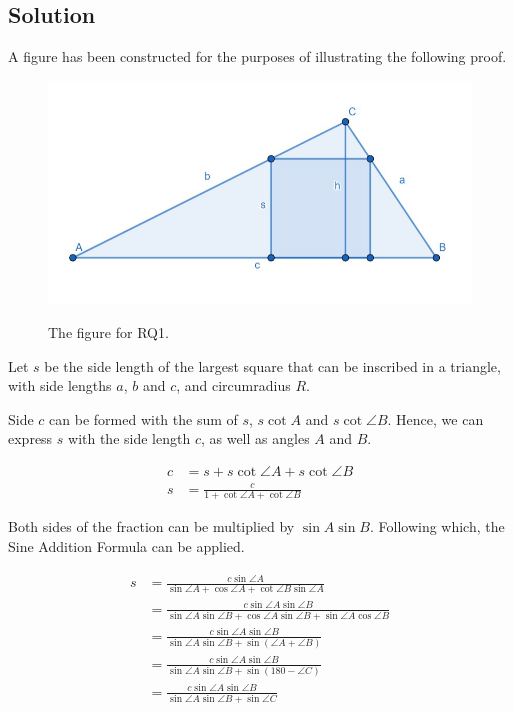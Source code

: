 \documentclass[12pt]{scrartcl}
\begin{document}
\subsection{Solution}
A figure has been constructed for the purposes of illustrating the following proof.
\begin{figure}[htpb]
	\centering
	\includegraphics[scale=.75]{images/rq1.jpg}
	\label{fig:rq1_img}
	\caption{The figure for RQ1.}
\end{figure}

Let $s$ be the side length of the largest square that can be inscribed in a triangle,
with side lengths $a$, $b$ and $c$, and circumradius $R$.

Side $c$ can be formed with the sum of $s$, $s \cot A$ and $s \cot \angle{B}$.
Hence, we can express $s$ with the side length $c$, as well as angles $A$ and $B$.

\begin{align*}
	c & = s+s\cot \angle{A}+s\cot \angle{B}          \\
	s & = \frac{c}{1+\cot \angle{A}+\cot \angle{B}}                                                                            
\end{align*}

Both sides of the fraction can be multiplied by $\sin A \sin B$. Following which, the
Sine Addition Formula can be applied.

\begin{align*}
	s & = \frac{c \sin\angle{A}}{\sin\angle{A}+\cos\angle{A}+\cot\angle{B}\sin\angle{A}}                                       \\
	  & = \frac{c\sin\angle{A}\sin\angle{B}}{\sin\angle{A}\sin\angle{B}+\cos\angle{A}\sin\angle{B}+\sin\angle{A}\cos\angle{B}} \\
	  & = \frac{c\sin\angle{A}\sin\angle{B}}{\sin\angle{A}\sin\angle{B}+\sin\left(\angle{A}+\angle{B}\right)}                  \\
	  & = \frac{c\sin\angle{A}\sin\angle{B}}{\sin\angle{A}\sin\angle{B}+\sin\left(180-\angle C\right)}                         \\
	  & = \frac{c\sin\angle{A}\sin\angle{B}}{\sin\angle{A}\sin\angle{B}+\sin \angle C}                                         
\end{align*}
\end{document}
